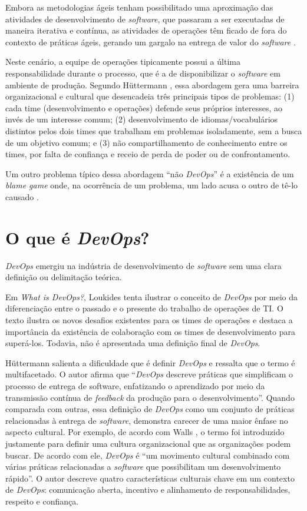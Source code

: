 Embora as metodologias ágeis tenham possibilitado uma aproximação das
atividades de desenvolvimento de \textit{software}, que passaram a ser
executadas de maneira iterativa e contínua, as atividades de operações têm
ficado de fora do contexto de práticas ágeis, gerando um gargalo na entrega
de valor do \textit{software} \cite{understanding_devops}.

Neste cenário, a equipe de operações tipicamente possui a última
responsabilidade durante o processo, que é a de disponibilizar o
\textit{software} em ambiente de produção. Segundo H\"uttermann
\cite{devops_for_developers}, essa abordagem gera uma barreira organizacional
e cultural que desencadeia três principais tipos de problemas: (1) cada time
(desenvolvimento e operações) defende seus próprios interesses, ao invés de
um interesse comum; (2) desenvolvimento de idiomas/vocabulários distintos pelos
dois times que trabalham em problemas isoladamente, sem a busca de um objetivo
comum; e (3) não compartilhamento de conhecimento entre os times, por falta
de confiança e receio de perda de poder ou de confrontamento.

Um outro problema típico dessa abordagem ``não \textit{DevOps}'' é a existência
de um \textit{blame game} onde, na ocorrência de um problema, um lado acusa
o outro de tê-lo causado \cite{toward_unified_model}.

\section{O que é \textit{DevOps}?}

\textit{DevOps} emergiu na indústria de desenvolvimento de \textit{software}
sem uma clara definição ou delimitação teórica.

Em \textit{What is DevOps?}, Loukides tenta ilustrar o conceito de
\textit{DevOps} por meio da diferenciação entre o passado e o presente do
trabalho de operações de \acrshort{TI}. O texto ilustra os novos desafios
existentes para os times de operações e destaca a importância da existência
de colaboração com os times de desenvolvimento para superá-los. Todavia,
não é apresentada uma definição final de \textit{DevOps}.

H\"uttermann \cite{devops_for_developers} salienta a dificuldade que é definir
\textit{DevOps} e ressalta que o termo é multifacetado. O autor afirma que
``\textit{DevOps} descreve práticas que simplificam o processo de entrega
de software, enfatizando o aprendizado por meio da transmissão contínua de
\textit{feedback} da produção para o desenvolvimento''. Quando comparada com
outras, essa definição de \textit{DevOps} como um conjunto de práticas
relacionadas à entrega de \textit{software}, demonstra carecer
de uma maior ênfase no aspecto cultural. Por exemplo, de acordo com
Walls \cite{building_devops_culture}, o termo foi introduzido justamente para
definir uma cultura organizacional que as organizações podem buscar. De acordo
com ele, \textit{DevOps} é ``um movimento cultural combinado com várias
práticas relacionadas a \textit{software} que possibilitam um desenvolvimento
rápido''. O autor descreve quatro características culturais chave em um
contexto de \textit{DevOps}: comunicação aberta, incentivo e alinhamento de
responsabilidades, respeito e confiança.

